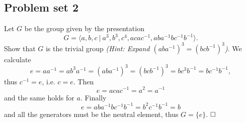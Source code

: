 \documentclass[11pt]{book}
\numberwithin{dummy}{section}
\theoremstyle{nonumberbreak}
\newenvironment{sol}[1][]{\ifthenelse{\equal{#1}{}}{\solution}{\solution[#1]}\rm}{\endsolution}
\newenvironment{prob}[1][]{\ifthenelse{\equal{#1}{}}{\problem}{\problem[#1]}\rm}{\endproblem}
\begin{document}
\begin{spacing}{1.4}
\section{Problem set 2} %
\renewcommand*\thesection{\arabic{section}}



\begin{prob}     %
Let $G$ be the group given by the presentation 
$$G= \langle a,b,c \ \vert \ a^3,b^3,c^4,acac^{-1},aba^{-1}bc^{-1}b^{-1} \rangle.$$
Show that $G$ is the trivial group \textit{(Hint: Expand $(aba^{-1})^3 = (bcb^{-1})^3$)}.
\begin{sol}
We calculate
$$e=aa^{-1} = ab^3a^{-1}=(aba^{-1})^3=(bcb^{-1})^3 = bc^3b^{-1} = bc^{-1}b^{-1},$$
thus $c^{-1}=e$, i.e. $c=e$. Then 
$$e=acac^{-1}=a^2 = a^{-1}$$
and the same holds for $a$. Finally
$$e=aba^{-1}bc^{-1}b^{-1} = b^2c^{-1}b^{-1} = b$$
and all the generators must be the neutral element, thus $G=\{e\}$. $\hfill \Box$
\end{sol}
\end{prob}




\end{spacing}
\end{document}
